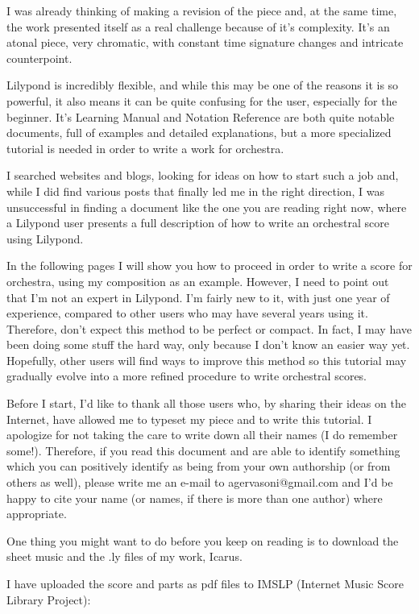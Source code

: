\documentclass{scrreprt}
\begin{document}
I was already thinking of making a revision of the piece and, at the same time, the work presented itself as a real challenge because of it's complexity. 
It's an atonal piece, very chromatic, with constant time signature changes and intricate counterpoint.

Lilypond is incredibly flexible, and while this may be one of the reasons it is so powerful, it also means it can be quite confusing for the user, especially for the beginner.
It's Learning Manual and Notation Reference are both quite notable documents, full of examples and detailed explanations, but a more specialized tutorial is needed in order to write a work for orchestra.

I searched websites and blogs, looking for ideas on how to start such a job and, while I did find various posts that finally led me in the right direction, I was unsuccessful in finding a document like the one you are reading right now, where a Lilypond user presents a full description of how to write an orchestral score using Lilypond.

In the following pages I will show you how  to proceed in order to write a score for orchestra, using my composition as an example.
However, I need to point out that I'm not an expert in Lilypond.
I'm fairly new to it, with just one year of experience, compared to other users who may have several years using it.
Therefore, don't expect this method to be perfect or compact.
In fact, I may have been doing some stuff the hard way, only because I don't know an easier way yet.
Hopefully, other users will find ways to improve this method so this tutorial may gradually evolve into a more refined procedure to write orchestral scores.

Before I start, I'd like to thank all those users who, by sharing their ideas on the Internet, have allowed me to typeset my piece and to write this tutorial.
I apologize for not taking the care to write down all their names (I do remember some!).
Therefore, if you read this document and are able to identify something which you can positively identify as being from your own authorship (or from others as well), please write me an e-mail to agervasoni@gmail.com and I'd be happy to cite your name (or names, if there is more than one author) where appropriate.

One thing you might want to do before you keep on reading is to download the sheet music and the .ly files of my work, Icarus.

I have uploaded the score and parts as pdf files to IMSLP (Internet Music Score Library Project):
\end{document}
